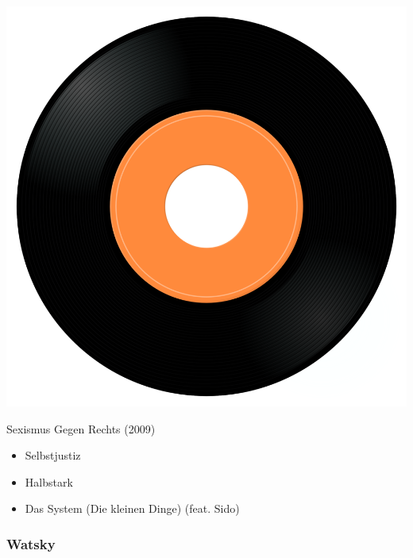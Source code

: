 \begin{minipage}[t]{0.25\textwidth}\vspace{0pt}
\captionsetup{type=figure}
\includegraphics[width=\textwidth]{Images/cover.png}
\caption*{Sexismus Gegen Rechts (2009)}
\end{minipage}
\begin{minipage}[t]{0.25\textwidth}\vspace{0pt}
\begin{itemize}[nosep,leftmargin=1em,labelwidth=*,align=left]
	\setlength{\itemsep}{0pt}
	\item Selbstjustiz
	\item Halbstark
	\item Das System (Die kleinen Dinge) (feat. Sido)
\end{itemize}
\end{minipage}

\subsubsection{Watsky}

